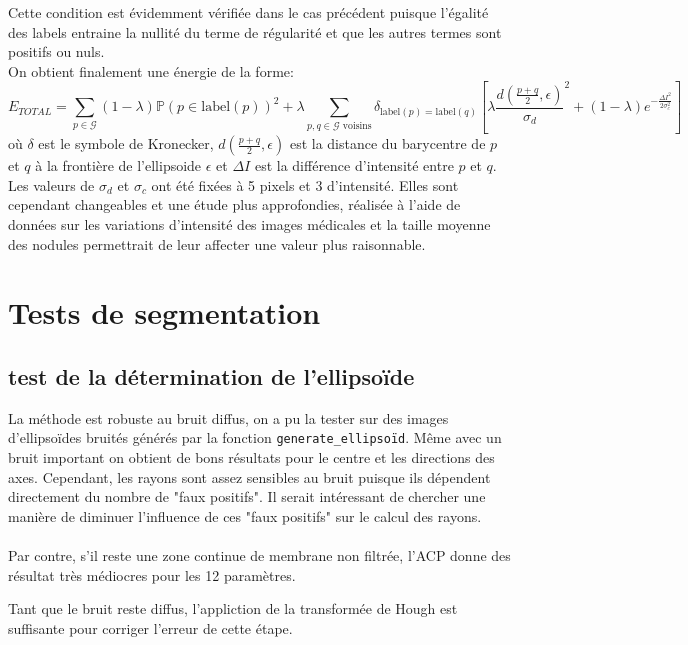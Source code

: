 \documentclass{article}
\newcommand{\lab}{\text{label}}
\begin{document}
Cette condition est évidemment vérifiée dans le cas précédent puisque l'égalité des labels entraine la nullité du terme de régularité et que les autres termes sont positifs ou nuls.\\
On obtient finalement une énergie de la forme:
\[
	E_{TOTAL} = \sum_{p \in \mathcal{G}} (1-\lambda)\mathbb{P}(p \in \lab(p))^2 + \lambda \sum _{p,q \in \mathcal{G} \text{ voisins}} \delta_{\lab(p) = \lab(q)} \left[ \lambda \frac{d\left(\frac{p+q}{2}, \epsilon \right)}{\sigma_d}^2 + (1-\lambda) e^{-\frac{\Delta I^2}{2\sigma_c^2}} \right]
\]
où $\delta$ est le symbole de Kronecker, $d\left(\frac{p+q}{2}, \epsilon \right)$ est la distance du barycentre de $p$ et $q$ à la frontière de l'ellipsoide $\epsilon$ et $\Delta I$ est la différence d'intensité entre $p$ et $q$. Les valeurs de $\sigma_d$ et $\sigma_c$ ont été fixées à 5 pixels et 3 d'intensité. Elles sont cependant changeables et une étude plus approfondies, réalisée à l'aide de données sur les variations d'intensité des images médicales et la taille moyenne des nodules permettrait de leur affecter une valeur plus raisonnable.

\section{Tests de segmentation}

\subsection{test de la détermination de l'ellipsoïde}


La méthode est robuste au bruit diffus, on a pu la tester sur des images d'ellipsoïdes bruités générés par la fonction \texttt{generate\_ellipsoïd}. Même avec un bruit important on obtient de bons résultats pour le centre et les directions des axes. Cependant, les rayons sont assez sensibles au bruit puisque ils dépendent directement du nombre de "faux positifs". Il serait intéressant de chercher une  manière de diminuer l'influence de ces "faux positifs" sur le calcul des rayons.\\\\ 
Par contre, s'il reste une zone continue de membrane non filtrée, l'ACP donne des résultat très médiocres pour les 12 paramètres.

Tant que le bruit reste diffus, l'appliction de la transformée de Hough est suffisante pour corriger l'erreur de cette étape.
\end{document}
